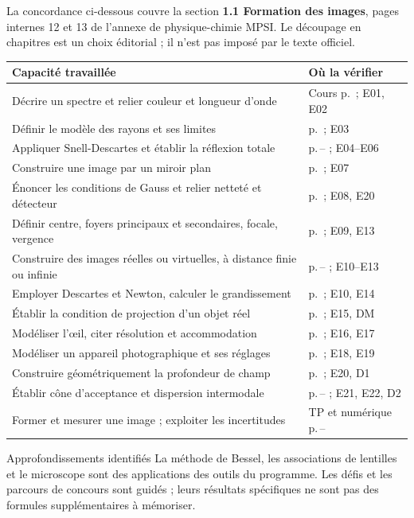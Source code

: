 La concordance ci-dessous couvre la section \textbf{1.1 Formation des images}, pages internes 12 et 13 de l'annexe de physique-chimie MPSI. Le découpage en chapitres est un choix éditorial ; il n'est pas imposé par le texte officiel.
\begingroup\small\renewcommand{\arraystretch}{1.35}
\begin{tabularx}{\linewidth}{@{}Y p{43mm}@{}}
\toprule
Capacité travaillée & Où la vérifier\\\midrule
Décrire un spectre et relier couleur et longueur d'onde & Cours p.\,\pageref{ch01-c-sources} ; E01, E02\\
Définir le modèle des rayons et ses limites & p.\,\pageref{ch01-c-modele} ; E03\\
Appliquer Snell-Descartes et établir la réflexion totale & p.\,\pageref{ch01-c-lois}--\pageref{ch01-c-totale} ; E04--E06\\
Construire une image par un miroir plan & p.\,\pageref{ch01-c-miroir} ; E07\\
Énoncer les conditions de Gauss et relier netteté et détecteur & p.\,\pageref{ch01-c-gauss} ; E08, E20\\
Définir centre, foyers principaux et secondaires, focale, vergence & p.\,\pageref{ch01-c-rayons} ; E09, E13\\
Construire des images réelles ou virtuelles, à distance finie ou infinie & p.\,\pageref{ch01-c-reelle}--\pageref{ch01-c-virtuelle} ; E10--E13\\
Employer Descartes et Newton, calculer le grandissement & p.\,\pageref{ch01-c-newton} ; E10, E14\\
Établir la condition de projection d'un objet réel & p.\,\pageref{ch01-c-projection} ; E15, DM\\
Modéliser l'œil, citer résolution et accommodation & p.\,\pageref{ch01-c-oeil} ; E16, E17\\
Modéliser un appareil photographique et ses réglages & p.\,\pageref{ch01-c-photo} ; E18, E19\\
Construire géométriquement la profondeur de champ & p.\,\pageref{ch01-c-profondeur} ; E20, D1\\
Établir cône d'acceptance et dispersion intermodale & p.\,\pageref{ch01-c-fibre}--\pageref{ch01-c-dispersion} ; E21, E22, D2\\
Former et mesurer une image ; exploiter les incertitudes & TP et numérique p.\,\pageref{ch01-c-tp}--\pageref{ch01-c-numerique}\\
\bottomrule
\end{tabularx}\endgroup
\begin{methode}{Approfondissements identifiés}
La méthode de Bessel, les associations de lentilles et le microscope sont des applications des outils du programme. Les défis et les parcours de concours sont guidés ; leurs résultats spécifiques ne sont pas des formules supplémentaires à mémoriser.
\end{methode}

